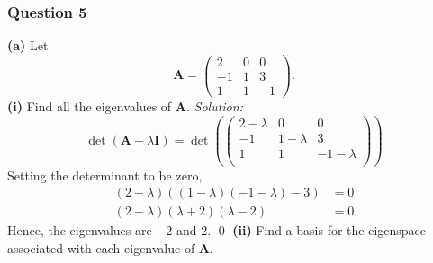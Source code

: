 \documentclass{article}
\begin{document}
\subsubsection*{Question 5}
\textbf{(a)} Let \[\mathbf{A}=\begin{pmatrix}2&0&0\\-1&1&3\\1&1&-1\end{pmatrix}.\] \textbf{(i)} Find all the eigenvalues of $\mathbf{A}$.
\newline
\newline \textit{Solution:} \[\det (\mathbf{A}-\lambda \mathbf{I})=\operatorname{det}\left(\left( \begin{matrix}
   2-\lambda  & 0 & 0  \\
   -1 & 1-\lambda  & 3  \\
   1 & 1 & -1-\lambda   \\
\end{matrix} \right)\right)\]
Setting the determinant to be zero,
\begin{align*}
    (2-\lambda)((1-\lambda)(-1-\lambda)-3)&=0\\
    (2-\lambda)(\lambda+2)(\lambda-2)&=0
\end{align*}
Hence, the eigenvalues are $-2$ and 2. \qed
\newline
\newline\textbf{(ii)} Find a basis for the eigenspace associated with each eigenvalue of $\mathbf{A}$.
\newline
\end{document}
